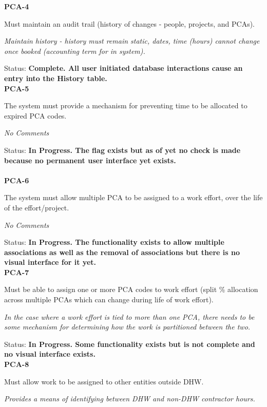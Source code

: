 \noindent \textbf{PCA-4}

\noindent Must maintain an audit trail (history of changes - people, projects, and PCAs).

\noindent \textit{Maintain history - history must remain static, dates, time (hours) cannot change once booked (accounting term for in system).}

\noindent Status: \textbf{Complete.  All user initiated database interactions cause an entry into the History table.}\\

\noindent \textbf{PCA-5}

\noindent The system must provide a mechanism for preventing time to be allocated to expired PCA codes.

\textit{No Comments}

\noindent Status: \textbf{In Progress.  The flag exists but as of yet no check is made because no permanent user interface yet exists.}\\
\\
\noindent \textbf{PCA-6}

\noindent The system must allow multiple PCA to be assigned to a work effort, over the life of the effort/project.

\textit{No Comments}

\noindent Status: \textbf{In Progress.  The functionality exists to allow multiple associations as well as the removal of associations but there is no visual interface for it yet.}\\

\noindent \textbf{PCA-7}

\noindent Must be able to assign one or more PCA codes to work effort (split \% allocation across multiple PCAs which can change during life of work effort).

\noindent \textit{In the case where a work effort is tied to more than one PCA, there needs to be some mechanism for determining how the work is partitioned between the two.}

\noindent Status: \textbf{In Progress.  Some functionality exists but is not complete and no visual interface exists.}\\

\noindent \textbf{PCA-8}

\noindent Must allow work to be assigned to other entities outside DHW.

\noindent \textit{Provides a means of identifying between DHW and non-DHW contractor hours.}

